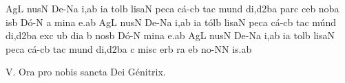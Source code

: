 \bigskip

{
\Internote
\nosolesmescustos
\initiumgregorianum
\sgn {}Ag\punctum L\egn
\sgn nus\punctum N\egn
\spatium
\sgn D{e}-\pes Na\egn
\sgn {}i,\punctum a\augmentum b\egn
\spatium
\divisiominima
\spatium
{}i{}\punctum a\egn
\spatium
\sgn t{o}l\punctum b\egn
\sgn lis\clivis aN\egn
\spatium
\sgn pec\punctum a\egn
\sgn c{\'a}-\clivis cb\egn
\sgn ta{}\punctum c\egn
\spatium
\sgn m{u}n\punctum d\egn
\sgn di,\episem d2\clivis ba\egn
\spatium
\divisiomaior
\spatium
\sgn p{a}r\punctum c\egn
\sgn ce{}\punctum b\egn
\spatium
\sgn n{o}b\punctum a\egn
\sgn {}is\punctum b\egn
\spatium
\sgn D{\'o}-\punctum N\egn
\custos a
\lineaproxima
\sgn min\punctum a\egn
\sgn {}e.\punctum a\augmentum b\egn
\spatium
\divisiofinalis
\spatium
\sgn {}Ag\punctum L\egn
\sgn nus\punctum N\egn
\spatium
\sgn D{e}-\pes Na\egn
\sgn {}i,\punctum a\augmentum b\egn
\spatium
\divisiominima
\spatium
{}i{}\punctum a\egn
\spatium
\sgn t{\'o}l\punctum b\egn
\sgn lis\clivis aN\egn
\spatium
\sgn pec\punctum a\egn
\sgn c{\'a}-\clivis cb\egn
\sgn ta{}\punctum c\egn
\spatium
\sgn m{\'u}n\punctum d\egn
\sgn di,\episem d2\clivis ba\egn
\spatium
\divisiomaior
\spatium
\sgn {}ex\punctum c\egn
{}u\punctum b\egn
\sgn di{}\punctum a\egn
\spatium
\custos b
\lineaproxima
\sgn nos\punctum b\egn
\spatium
\sgn D{\'o}-\punctum N\egn
\sgn min\punctum a\egn
\sgn {}e.\punctum a\augmentum b\egn
\spatium
\divisiofinalis
\spatium
\sgn {}Ag\punctum L\egn
\sgn nus\punctum N\egn
\spatium
\sgn D{e}-\pes Na\egn
\sgn {}i,\punctum a\augmentum b\egn
\spatium
\divisiominima
\spatium
{}i{}\punctum a\egn
\spatium
\sgn t{o}l\punctum b\egn
\sgn lis\clivis aN\egn
\spatium
\sgn pec\punctum a\egn
\sgn c{\'a}-\clivis cb\egn
\sgn ta{}\punctum c\egn
\spatium
\sgn m{u}n\punctum d\egn
\sgn di,\episem d2\clivis ba\egn
\spatium
\divisiomaior
\spatium
\custos c
\lineaproxima
\sgn mis\punctum c\egn
\sgn {}er\punctum b\egn
{}r\punctum a\egn
\sgn {}e{}\punctum b\egn
\spatium
\sgn n{o}-\punctum N\augmentum N\egn
{}i{s.}\punctum a\augmentum b\egn
\spatium
\Finisgregoriana
}


\bigskip

\s V. Ora pro nobis sancta Dei G\'enitrix.

